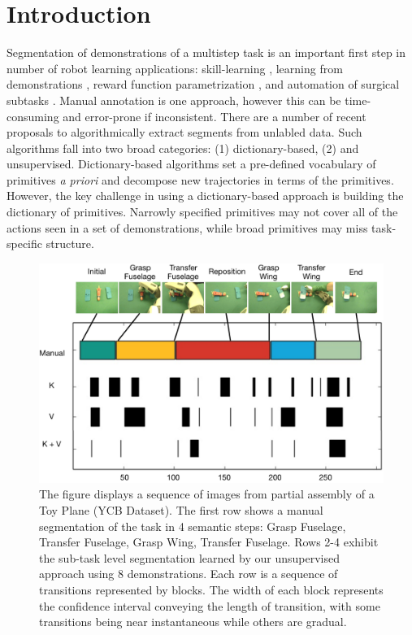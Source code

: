 \section{Introduction}
Segmentation of demonstrations of a multistep task is an important first step in number of robot learning applications: skill-learning \cite{calinon2010learning, kruger2010learning, konidaris2011robot}, learning from demonstrations \cite{Niekum2015learning}, reward function parametrization \cite{hanlearning}, and automation of surgical subtasks \cite{murali2015learning}.
Manual annotation is one approach, however this can be time-consuming and error-prone if inconsistent.
There are a number of recent proposals to algorithmically extract segments from unlabled data.
Such algorithms fall into two broad categories: (1) dictionary-based, (2) and unsupervised.
Dictionary-based algorithms set a pre-defined vocabulary of primitives \emph{a priori} and decompose new trajectories in terms of the primitives.
However, the key challenge in using a dictionary-based approach is building the dictionary of primitives. 
Narrowly specified primitives may not cover all of the actions seen in a set of demonstrations, while broad primitives may miss task-specific structure.

\begin{figure}[t!]
\centering
\includegraphics[width=\linewidth]{figures/pr2_plane_assembly.png}
\caption{The figure displays a sequence of images from partial assembly of a Toy Plane (YCB Dataset). The first row shows a manual segmentation of the task in 4 semantic steps: Grasp Fuselage, Transfer Fuselage, Grasp Wing, Transfer Fuselage. Rows 2-4 exhibit the sub-task level segmentation learned by our  unsupervised approach using 8 demonstrations. Each row is a sequence of transitions represented by blocks. The width of each block represents the confidence interval conveying the length of transition, with some transitions being near instantaneous while others are gradual.}
\vspace{-10pt} 
\end{figure}


